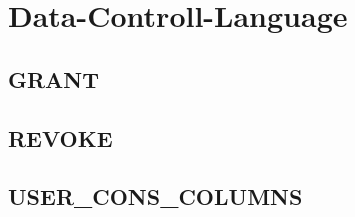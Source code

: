 \section[DCL]{Data-Controll-Language}
\label{sec:dcl}

\subsection{GRANT}
\label{sec:dcl.grant}

\subsection{REVOKE}
\label{sec:dcl.revoke}

\subsection{USER\_CONS\_COLUMNS}
\label{sec:dcl.user_cons_columns}
